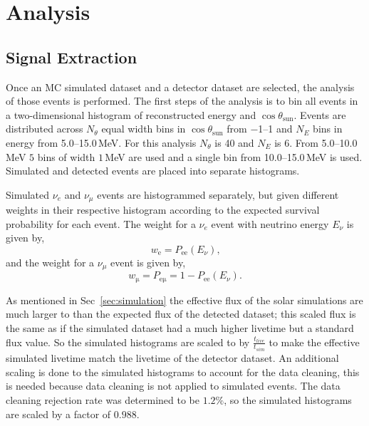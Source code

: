 \chapter{Analysis}
\label{sec:analysis}
\section{Signal Extraction}
Once an MC simulated dataset and a detector dataset are selected, the analysis
of those events is performed.
The first steps of the analysis is to bin all events
in a two-dimensional histogram of reconstructed energy and $\cos\theta_{\mathrm{sun}}$.
Events are distributed across $N_{\theta}$ equal width bins in $\cos\theta_{\mathrm{sun}}$ from
\numrange{-1}{1} and
$N_{E}$ bins in energy from \numrange{5.0}{15.0}\,MeV.
For this analysis $N_{\theta}$ is 40 and $N_{E}$ is 6.
From \numrange{5.0}{10.0}\,MeV $5$ bins of width $1$\,MeV are used and
a single bin from \numrange{10.0}{15.0}\,MeV is used.
Simulated and detected events are placed into separate histograms.

Simulated $\nu_{e}$ and $\nu_{\mu}$ events are histogrammed separately,
but given different weights in their respective histogram according to the expected survival probability
for each event.
The weight for a $\nu_{e}$ event with neutrino energy $E_{\nu}$ is given by,
\begin{equation}
    w_{\mathrm{e}} = P_{\mathrm{ee}}(E_{\nu})\text{,}
\end{equation}
and the weight for a $\nu_{\mu}$ event is given by,
\begin{equation}
    w_{\mathrm{\mu}}= P_{\mathrm{e\mu}} = 1 - P_{\mathrm{ee}}(E_{\nu})\text{.}
\end{equation}

As mentioned in Sec~\ref{sec:simulation} the effective flux of the solar
simulations are much larger to than the expected flux of the detected dataset;
this scaled flux is the same as if the simulated dataset had a much higher livetime
but a standard flux value.
So the simulated histograms are
scaled to by $\frac{t_{live}}{t_{sim}}$ to make the effective simulated
livetime match the livetime of the detector dataset.
An additional scaling is done to the simulated histograms to account
for the data cleaning, this is needed because data cleaning
is not applied to simulated events.
The data cleaning rejection rate was determined to be $1.2\%$, so the
simulated histograms are scaled by a factor of $0.988$.

